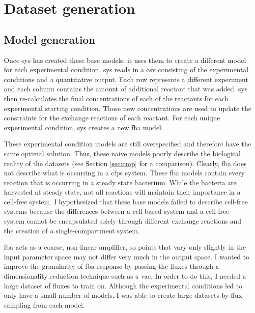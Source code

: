 
\section{Dataset generation}

\subsection{Model generation}
Once \gls{sys} has created these base models, it uses them to create a different model for each experimental condition.
\gls{sys} reads in a \gls{csv} consisting of the experimental conditions and a quantitative output.
Each row represents a different experiment and each column contains the amount of additional reactant that was added.
\gls{sys} then re-calculates the final concentrations of each of the reactants for each experimental starting condition.
Those new concentrations are used to update the constraints for the exchange reactions of each reactant.
For each unique experimental condition, \gls{sys} creates a new \gls{fba} model.

These experimental condition models are still overspecified and therefore have the same optimal solution.
Thus, these naive models poorly describe the biological reality of the datasets (see Section \ref{sec:cmp} for a comparison).
Clearly, \gls{fba} does not describe what is occurring in a \gls{cfps} system.
These \gls{fba} models contain every reaction that is occurring in a steady state bacterium.
While the bacteria are harvested at steady state, not all reactions will maintain their importance in a cell-free system.
I hypothesized that these base models failed to describe cell-free systems because the differences between a cell-based system and a cell-free system cannot be encapsulated solely through different exchange reactions and the creation of a single-compartment system.

\gls{fba} acts as a coarse, non-linear amplifier, so points that vary only slightly in the input parameter space may not differ very much in the output space.
I wanted to improve the granularity of \gls{fba} response by passing the fluxes through a dimensionality reduction technique such as a \gls{vae}.
In order to do this, I needed a large dataset of fluxes to train on.
Although the experimental conditions led to only have a small number of models, I was able to create large datasets by flux sampling from each model.

